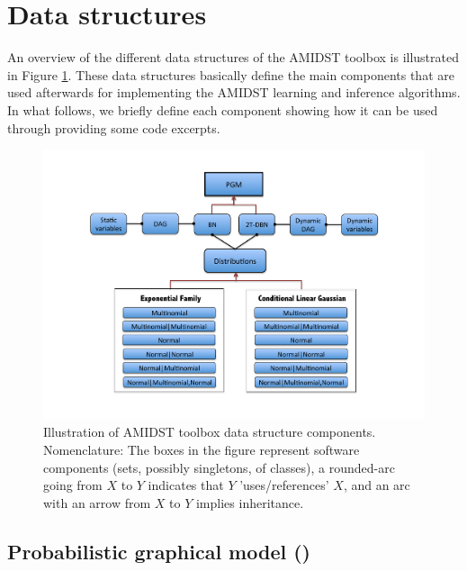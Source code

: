 \section{Data structures} \label{sec:DataStructures}

An overview of the different data structures of the AMIDST toolbox is illustrated in Figure \ref{Figure:ToolboxDataStructures}. These data structures basically define the main components that are used afterwards for implementing the AMIDST learning and inference algorithms. In what follows, we briefly define each component showing how it can be used through providing some code excerpts. 

\begin{figure}[ht!]
\begin{center}
\includegraphics[width=\linewidth]{./figures/DataStructure}
\caption{\label{Figure:ToolboxDataStructures} Illustration of AMIDST toolbox data structure components. Nomenclature: The boxes in the
      figure represent software components (sets, possibly singletons, of classes), a rounded-arc going from $X$ to $Y$ indicates that $Y$ 'uses/references' $X$, and an arc with an arrow from $X$ to $Y$ implies inheritance.}
\end{center}
\end{figure}

\subsection{Probabilistic graphical model ()}

